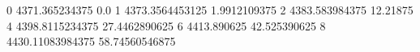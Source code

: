 0 4371.365234375 0.0
1 4373.3564453125 1.9912109375
2 4383.583984375 12.21875
4 4398.8115234375 27.4462890625
6 4413.890625 42.525390625
8 4430.11083984375 58.74560546875
